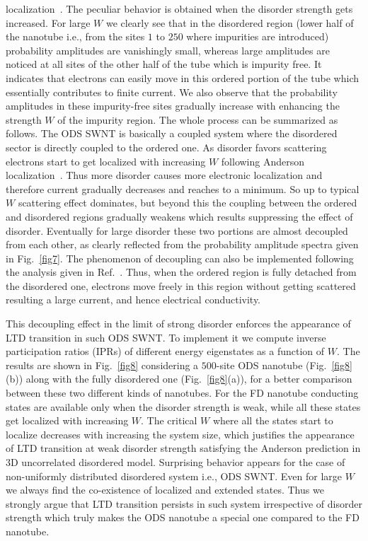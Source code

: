 \documentclass[prb,aps,twocolumn,amsmath,amssymb,floatfix,
superscriptaddress]{revtex4}
\begin{document}
localization~\cite{ander}. 
The peculiar behavior is obtained when the disorder strength gets increased.
For large $W$ we clearly see that in the disordered region (lower half of the 
nanotube i.e., from the sites $1$ to $250$ where impurities are introduced)
probability amplitudes are vanishingly small, whereas large amplitudes are 
noticed at all sites of the other half of the tube which is impurity free. It 
indicates that electrons can easily move in this ordered portion of the tube 
which essentially contributes to finite current. We also observe that the 
probability amplitudes in these impurity-free sites gradually increase with 
enhancing the strength $W$ of the impurity region. The whole process can be 
summarized as follows. The ODS SWNT is basically a coupled system where the 
disordered sector is directly coupled to the ordered one. As disorder favors 
scattering electrons start to get localized with increasing $W$ following 
Anderson localization~\cite{ander}. Thus more disorder causes more electronic 
localization
and therefore current gradually decreases and reaches to a minimum. So up to 
typical $W$ scattering effect dominates, but beyond this the coupling between 
the ordered and disordered regions gradually weakens which results suppressing 
the effect of disorder. Eventually for large disorder these two portions are
almost decoupled from each other, as clearly reflected from the probability 
amplitude spectra given in Fig.~\ref{fig7}. The phenomenon of decoupling can 
also be implemented following the analysis given in Ref.~\cite{div5}. Thus, 
when the ordered region is fully detached from the disordered one, electrons 
move freely in this region without getting scattered resulting a large current, 
and hence electrical conductivity. 

This decoupling effect in the limit of strong disorder enforces the appearance 
of LTD transition in such ODS SWNT. To implement it we compute inverse 
participation ratios (IPRs) of different energy eigenstates as a function of
$W$. The results are shown in Fig.~\ref{fig8} considering a $500$-site ODS 
nanotube (Fig.~\ref{fig8}(b)) along with the fully disordered one
(Fig.~\ref{fig8}(a)), for a better comparison between these two different kinds 
of nanotubes. For the FD nanotube conducting states are available only when the 
disorder strength is weak, while all these states get localized with increasing
$W$. The critical $W$ where all the states start to localize decreases with 
increasing the system size, which justifies the appearance of LTD transition at
weak disorder strength satisfying the Anderson prediction in 3D uncorrelated 
disordered model. Surprising behavior appears for the case of non-uniformly
distributed disordered system i.e., ODS SWNT. Even for large $W$ we always 
find the co-existence of localized and extended states. Thus we strongly 
argue that LTD transition persists in such system irrespective of disorder
strength which truly makes the ODS nanotube a special one compared to the FD 
nanotube.
\end{document}
